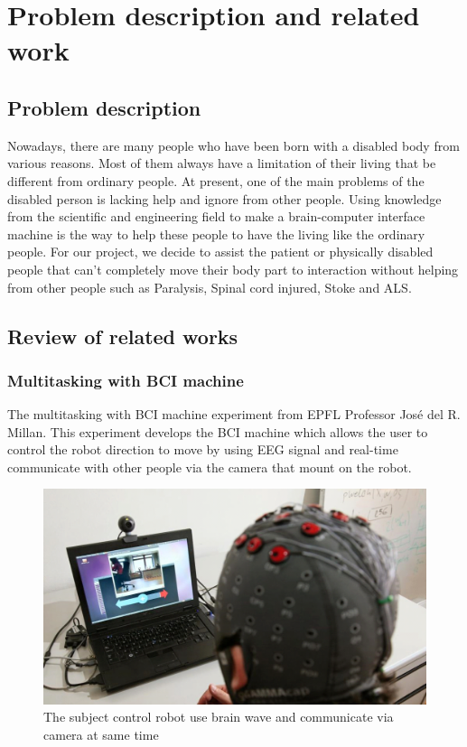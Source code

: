 \chapter{Problem description and related work}

\label{ch:Problem description and related work}

\setlength{\parindent}{4em}
\setlength{\parskip}{1em}
\renewcommand{\baselinestretch}{1.5}

\section{Problem description}
\hspace{1.5cm} Nowadays, there are many people who have been born with a disabled body from various reasons. Most of them always have a limitation of their living that be different from ordinary people. At present, one of the main problems of the disabled person is lacking help and ignore from other people. Using knowledge from the scientific and engineering field to make a brain-computer interface machine is the way to help these people to have the living like the ordinary people. For our project, we decide to assist the patient or physically disabled people that can't completely move their body part to interaction without helping from other people such as Paralysis, Spinal cord injured, Stoke and ALS.

\section{Review of related works}
\subsection {Multitasking with BCI machine\cite{ref1}}
\hspace{1.5cm} The multitasking with BCI machine experiment from EPFL Professor José del R. Millan. This experiment develops the BCI machine which allows the user to control the robot direction to move by using EEG signal and real-time communicate with other people via the camera that mount on the robot.
\begin{figure}[h]
	\centering
  	\includegraphics[scale = 0.4]{chapter2/21.pdf}
  	\caption{The subject control robot use brain wave and communicate via camera at same time}
\end{figure}

